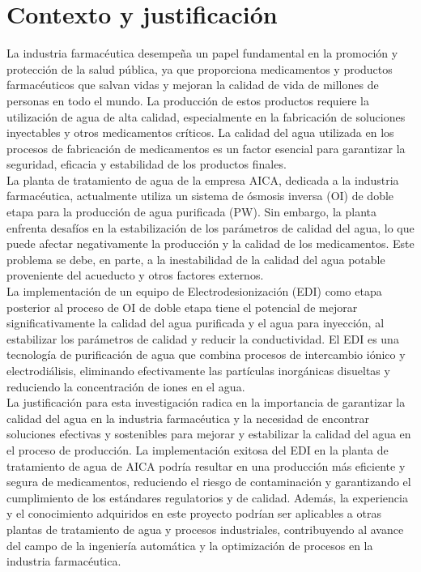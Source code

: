 \section{Contexto y justificación}
La industria farmacéutica desempeña un papel fundamental en la promoción y protección de la salud pública, ya que proporciona medicamentos y productos farmacéuticos que salvan vidas y mejoran la calidad de vida de millones de personas en todo el mundo. La producción de estos productos requiere la utilización de agua de alta calidad, especialmente en la fabricación de soluciones inyectables y otros medicamentos críticos. La calidad del agua utilizada en los procesos de fabricación de medicamentos es un factor esencial para garantizar la seguridad, eficacia y estabilidad de los productos finales.\\

La planta de tratamiento de agua de la empresa AICA, dedicada a la industria farmacéutica, actualmente utiliza un sistema de ósmosis inversa (OI) de doble etapa para la producción de agua purificada (PW). Sin embargo, la planta enfrenta desafíos en la estabilización de los parámetros de calidad del agua, lo que puede afectar negativamente la producción y la calidad de los medicamentos. Este problema se debe, en parte, a la inestabilidad de la calidad del agua potable proveniente del acueducto y otros factores externos.\\

La implementación de un equipo de Electrodesionización (EDI) como etapa posterior al proceso de OI de doble etapa tiene el potencial de mejorar significativamente la calidad del agua purificada y el agua para inyección, al estabilizar los parámetros de calidad y reducir la conductividad. El EDI es una tecnología de purificación de agua que combina procesos de intercambio iónico y electrodiálisis, eliminando efectivamente las partículas inorgánicas disueltas y reduciendo la concentración de iones en el agua.\\

La justificación para esta investigación radica en la importancia de garantizar la calidad del agua en la industria farmacéutica y la necesidad de encontrar soluciones efectivas y sostenibles para mejorar y estabilizar la calidad del agua en el proceso de producción. La implementación exitosa del EDI en la planta de tratamiento de agua de AICA podría resultar en una producción más eficiente y segura de medicamentos, reduciendo el riesgo de contaminación y garantizando el cumplimiento de los estándares regulatorios y de calidad. Además, la experiencia y el conocimiento adquiridos en este proyecto podrían ser aplicables a otras plantas de tratamiento de agua y procesos industriales, contribuyendo al avance del campo de la ingeniería automática y la optimización de procesos en la industria farmacéutica.\\
